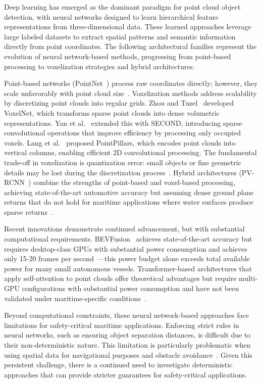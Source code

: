 \documentclass[../main.tex]{subfiles}
\begin{document}
Deep learning has emerged as the dominant paradigm for point cloud object detection, with neural networks designed to learn hierarchical feature representations from three-dimensional data.
These learned approaches leverage large labeled datasets to extract spatial patterns and semantic information directly from point coordinates.
The following architectural families represent the evolution of neural network-based methods, progressing from point-based processing to voxelization strategies and hybrid architectures.

Point-based networks (PointNet~\cite{qi2017}) process raw coordinates directly; however, they scale unfavorably with point cloud size~\cite{shi2019}.
Voxelization methods address scalability by discretizing point clouds into regular grids.
Zhou and Tuzel~\cite{zhou2018} developed VoxelNet, which transforms sparse point clouds into dense volumetric representations.
Yan et al.~\cite{yan2018} extended this with SECOND, introducing sparse convolutional operations that improve efficiency by processing only occupied voxels.
Lang et al.~\cite{lang2019} proposed PointPillars, which encodes point clouds into vertical columns, enabling efficient 2D convolutional processing.
The fundamental trade-off in voxelization is quantization error: small objects or fine geometric details may be lost during the discretization process~\cite{zhou2018}.
Hybrid architectures (PV-RCNN~\cite{shi2019, shi2020}) combine the strengths of point-based and voxel-based processing, achieving state-of-the-art automotive accuracy but assuming dense ground plane returns that do not hold for maritime applications where water surfaces produce sparse returns~\cite{kunz2005}.

Recent innovations demonstrate continued advancement, but with substantial computational requirements.
BEVFusion~\cite{liang2022, liu2023b} achieves state-of-the-art accuracy but requires desktop-class GPUs with substantial power consumption and achieves only 15-20 frames per second~\cite{liu2023b}---this power budget alone exceeds total available power for many small autonomous vessels.
Transformer-based architectures that apply self-attention to point clouds offer theoretical advantages but require multi-GPU configurations with substantial power consumption and have not been validated under maritime-specific conditions~\cite{xie2024}.

Beyond computational constraints, these neural network-based approaches face limitations for safety-critical maritime applications.
Enforcing strict rules in neural networks, such as ensuring object separation distances, is difficult due to their non-deterministic nature.
This limitation is particularly problematic when using spatial data for navigational purposes and obstacle avoidance~\cite{coyleE}.
Given this persistent challenge, there is a continued need to investigate deterministic approaches that can provide stricter guarantees for safety-critical applications.
\end{document}
